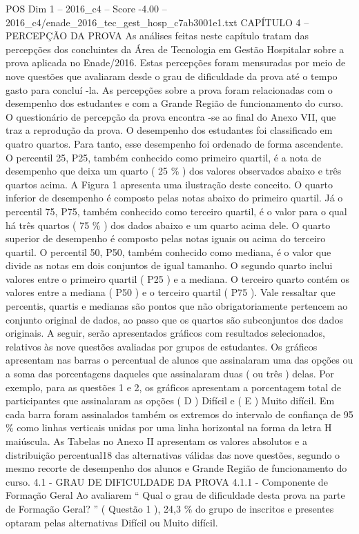 \begin{textsample}{POS Dim 1 – 2016\_c4 – Score -4.00 – 2016\_c4/enade\_2016\_tec\_gest\_hosp\_c7ab3001e1.txt}  \label{ex:f1_pos_289}
CAPÍTULO 4 – PERCEPÇÃO DA PROVA As análises feitas neste capítulo tratam das percepções dos concluintes da Área de Tecnologia em Gestão Hospitalar sobre a prova aplicada no Enade/2016.
Estas percepções foram mensuradas por meio de nove questões que avaliaram desde o grau de dificuldade da prova até o tempo gasto para concluí -la.
As percepções sobre a prova foram relacionadas com o desempenho dos estudantes e com a Grande Região de funcionamento do curso.
O questionário de percepção da prova encontra -se ao final do Anexo VII, que traz a reprodução da prova.
O desempenho dos estudantes foi classificado em quatro quartos.
Para tanto, esse desempenho foi ordenado de forma ascendente.
O percentil 25, P25, também conhecido como primeiro quartil, é a nota de desempenho que deixa um quarto ( 25 \% ) dos valores observados abaixo e três quartos acima.
A Figura 1 apresenta uma ilustração deste conceito.
O quarto inferior de desempenho é composto pelas notas abaixo do primeiro quartil.
Já o percentil 75, P75, também conhecido como terceiro quartil, é o valor para o qual há três quartos ( 75 \% ) dos dados abaixo e um quarto acima dele.
O quarto superior de desempenho é composto pelas notas iguais ou acima do terceiro quartil.
O percentil 50, P50, também conhecido como mediana, é o valor que divide as notas em dois conjuntos de igual tamanho.
O segundo quarto inclui valores entre o primeiro quartil ( P25 ) e a mediana.
O terceiro quarto contém os valores entre a mediana ( P50 ) e o terceiro quartil ( P75 ).
Vale ressaltar que percentis, quartis e medianas são pontos que não obrigatoriamente pertencem ao conjunto original de dados, ao passo que os quartos são subconjuntos dos dados originais.
A seguir, serão apresentados gráficos com resultados selecionados, relativos às nove questões avaliadas por grupos de estudantes.
Os gráficos apresentam nas barras o percentual de alunos que assinalaram uma das opções ou a soma das porcentagens daqueles que assinalaram duas ( ou três ) delas.
Por exemplo, para as questões 1 e 2, os gráficos apresentam a porcentagem total de participantes que assinalaram as opções ( D ) Difícil e ( E ) Muito difícil.
Em cada barra foram assinalados também os extremos do intervalo de confiança de 95 \% como linhas verticais unidas por uma linha horizontal na forma da letra H maiúscula.
As Tabelas no Anexo II apresentam os valores absolutos e a distribuição percentual18 das alternativas válidas das nove questões, segundo o mesmo recorte de desempenho dos alunos e Grande Região de funcionamento do curso. 4.1 - GRAU DE DIFICULDADE DA PROVA 4.1.1 - Componente de Formação Geral Ao avaliarem “ Qual o grau de dificuldade desta prova na parte de Formação Geral? ” ( Questão 1 ), 24,3 \% do grupo de inscritos e presentes optaram pelas alternativas Difícil ou Muito difícil.

\end{textsample}

